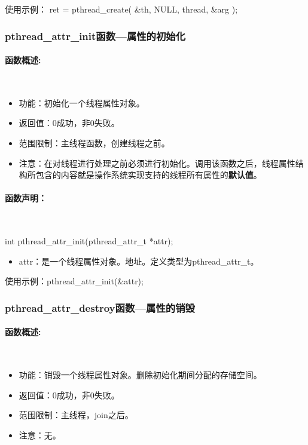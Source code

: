 \documentclass[UTF8]{article}%
\begin{document}
使用示例： ret = pthread\_create( \&th, NULL, thread, \&arg );  

\subsubsection{pthread\_attr\_init函数---属性的初始化}

\paragraph{函数概述:}~{}

\begin{itemize}
    \item 功能：初始化一个线程属性对象。
    \item 返回值：0成功，非0失败。
    \item 范围限制：主线程函数，创建线程之前。
    \item 注意：在对线程进行处理之前必须进行初始化。调用该函数之后，线程属性结构所包含的内容就是操作系统实现支持的线程所有属性的\textbf{默认值}。
\end{itemize}

\paragraph{函数声明：}~{}

int pthread\_attr\_init(pthread\_attr\_t *attr);

\begin{itemize}
    \item attr：是一个线程属性对象。地址。定义类型为pthread\_attr\_t。
\end{itemize}

使用示例：pthread\_attr\_init(\&attr);

\subsubsection{pthread\_attr\_destroy函数---属性的销毁}

\paragraph{函数概述:}~{}

\begin{itemize}
    \item 功能：销毁一个线程属性对象。删除初始化期间分配的存储空间。
    \item 返回值：0成功，非0失败。
    \item 范围限制：主线程，join之后。
    \item 注意：无。
\end{itemize}
\end{document}
